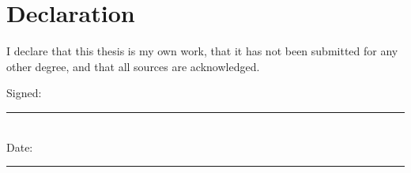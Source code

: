 \chapter*{Declaration}
I declare that this thesis is my own work, that it has not been submitted for
any other degree, and that all sources are acknowledged.

\vspace{2cm}
\noindent Signed: \rule{6cm}{0.4pt}\\[1em]
Date: \rule{6cm}{0.4pt}
